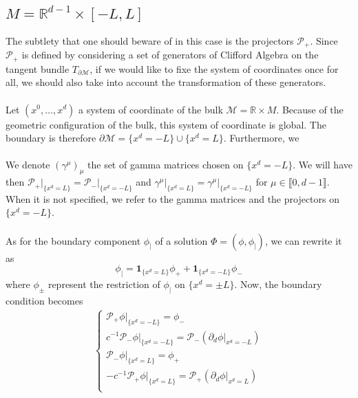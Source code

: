 \subsection{${M} = \mathbb{R}^{d-1} \times [-L, L]$ }\label{wen-subsect-saw2}
The subtlety that one should beware of in this case is the projectors $\mathcal{P}_+$.
Since $\mathcal{P}_+$ is defined by considering a set of generators of Clifford Algebra on the tangent bundle $T_{ \partial \mathcal{M}}$, 
if we would like to fixe the system of coordinates once for all,
we should also take into account the transformation of these generators. \\\\
Let $(x^0, \ldots, x^d)$ a system of coordinate of the bulk $\mathcal{M} =\mathbb{R}\times M $. 
Because of the geometric configuration of the bulk, 
this system of coordinate is global. 
The boundary is therefore $\partial \mathcal{M} = \{x^d = -L \} \cup \{ x^d = L \}$.
Furthermore, we  \\\\
We denote $(\gamma^\mu)_\mu$ the set of gamma matrices chosen on $\{x^d  = - L \}$. 
We will have then $\mathcal{P}_+\vert_{\{x^d = L\}} = \mathcal{P}_-\vert_{\{x^d = -L\}}$ and $\gamma^\mu\vert_{\{x^d = L\}}=\gamma^\mu\vert_{\{x^d = -L\}}$ for $\mu\in\llbracket 0, d-1 \rrbracket$.
When it is not specified, we refer to the gamma matrices and the projectors on $\{x^d = -L\}$. \\\\
%
As for the boundary component $\phi_|$ of a solution $\Phi= (\phi, \phi_|)$,
we can rewrite it as
\begin{equation*}
\phi_| = \mathbf{1}_{\{x^d = L \}}\phi_+ + \mathbf{1}_{\{x^d = - L \}}\phi_-
\end{equation*}
where $\phi_\pm$ represent the restriction of $\phi_|$ on $\{x^d = \pm L \}$.
Now, the boundary condition becomes
\begin{equation}\label{wen-saw2bound}
\begin{split}
\begin{cases}
\mathcal{P}_+ \phi\vert_{\{x^d = -L\}} = \phi_- \\
c^{-1}\mathcal{P}_-\phi\vert_{\{x^d = -L\}} = \mathcal{P}_-(\partial_d \phi\vert_{x^d = -L}) \\
\mathcal{P}_- \phi\vert_{\{x^d = L\}} =\phi_+ \\
-c^{-1}\mathcal{P}_+\phi\vert_{\{x^d = L\}} = \mathcal{P}_+(\partial_d \phi\vert_{x^d = L}) \\
\end{cases}
\end{split}
\end{equation}
